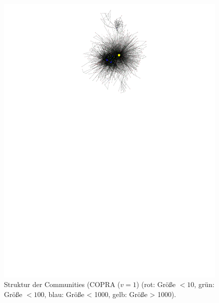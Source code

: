 \begin{figure}[h!]
  \centering
  \includegraphics[scale=2]{images/metagraph-copra1-minsize5.pdf}
  \caption{Struktur der Communities (COPRA ($v=1$) (rot: Größe
    $<10$, grün: Größe $<100$, blau: Größe < 1000, gelb:
    Größe > 1000).}
  \label{fig:metagraph-com-copra}
\end{figure}


